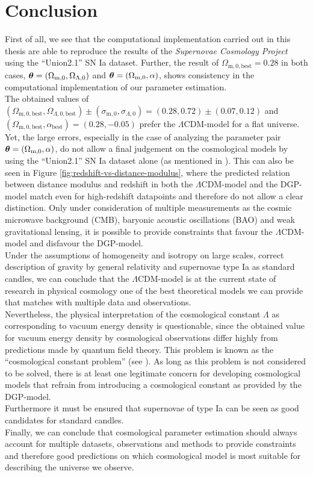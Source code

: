\chapter{Conclusion}
\thispagestyle{empty}

\noindent First of all, we see that the computational implementation carried out in this thesis are able to reproduce the results of the \textit{Supernovae Cosmology Project} using the ``Union2.1'' SN Ia dataset.
Further, the result of $\Omega_{\text{m},0,\text{best}} = 0.28$ in both cases, $\vb*{\theta} = (\Omega_{\text{m},0}, \Omega_{\Lambda,0})$ and $\vb*{\theta} = (\Omega_{\text{m},0}, \alpha)$, shows consistency in the computational implementation of our parameter estimation. \\

\noindent The obtained values of $(\Omega_{\text{m}, 0, \text{best}}, \Omega_{\Lambda, 0, \text{best}}) \pm (\sigma_{\text{m}, 0}, \sigma_{\Lambda,0}) = (0.28, 0.72) \pm (0.07, 0.12)$ and \\
${(\Omega_{\text{m}, 0, \text{best}}, \alpha_{\text{best}}) = (0.28, -0.05)}$ prefer the $\Lambda$CDM-model for a flat universe. Yet, the large errors, especially in the case of analyzing the parameter pair $\vb*{\theta} = (\Omega_{\text{m},0}, \alpha)$, do not allow a final judgement on the cosmological models by using the ``Union2.1'' SN Ia dataset alone (as mentioned in \cite{Thomas2009}). This can also be seen in Figure \ref{fig:redshift-vs-distance-modulus}, where the predicted relation between distance modulus and redshift in both the $\Lambda$CDM-model and the DGP-model match even for high-redshift datapoints and therefore do not allow a clear distinction. Only under consideration of multiple measurements as the cosmic microwave background (CMB), baryonic acoustic oscillations (BAO) and weak gravitational lensing, it is possible to provide constraints that favour the $\Lambda$CDM-model and disfavour the DGP-model. \\

\noindent Under the assumptions of homogeneity and isotropy on large scales, correct description of gravity by general relativity and supernovae type Ia as standard candles, we can conclude that the $\Lambda$CDM-model is at the current state of research in physical cosmology one of the best theoretical models we can provide that matches with multiple data and observations. \\

\noindent Nevertheless, the physical interpretation of the cosmological constant $\Lambda$ as corresponding to vacuum energy density is questionable, since the obtained value for vacuum energy density by cosmological observations differ highly from predictions made by quantum field theory. This problem is known as the ``cosmological constant problem'' (see \cite{Weinberg1989}). As long as this problem is not considered to be solved, there is at least one legitimate concern for developing cosmological models that refrain from introducing a cosmological constant as provided by the DGP-model. \\
Furthermore it must be ensured that supernovae of type Ia can be seen as good candidates for standard candles. \\

\noindent Finally, we can conclude that cosmological parameter estimation should always account for multiple datasets, observations and methods to provide constraints and therefore good predictions on which cosmological model is most suitable for describing the universe we observe. 
